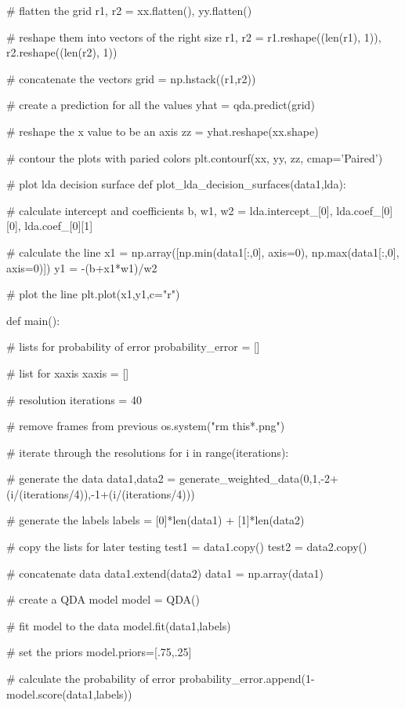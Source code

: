 \documentclass{article}
\begin{document}
{\begin{python}
	# flatten the grid
	r1, r2 = xx.flatten(), yy.flatten()

	# reshape them into vectors of the right size
	r1, r2 = r1.reshape((len(r1), 1)), r2.reshape((len(r2), 1))
	
	# concatenate the vectors
	grid = np.hstack((r1,r2))

	# create a prediction for all the values
	yhat = qda.predict(grid)

	# reshape the x value to be an axis
	zz = yhat.reshape(xx.shape)

	# contour the plots with paried colors
	plt.contourf(xx, yy, zz, cmap='Paired')
		
# plot lda decision surface
def plot_lda_decision_surfaces(data1,lda):

	# calculate intercept and coefficients
	b, w1, w2 = lda.intercept_[0], lda.coef_[0][0], lda.coef_[0][1]    

	# calculate the line
	x1 = np.array([np.min(data1[:,0], axis=0), np.max(data1[:,0], axis=0)])
	y1 = -(b+x1*w1)/w2

	# plot the line
	plt.plot(x1,y1,c="r")
	

def main():
	
		# lists for probability of error
		probability_error = []
	
		# list for xaxis
		xaxis = []
	
		# resolution
		iterations = 40
	
		# remove frames from previous
		os.system("rm this*.png")
	
		# iterate through the resolutions
		for i in range(iterations):
	
			# generate the data
			data1,data2 = generate_weighted_data(0,1,-2+(i/(iterations/4)),-1+(i/(iterations/4)))
	
			# generate the labels
			labels = [0]*len(data1) + [1]*len(data2)
	
			# copy the lists for later testing
			test1 = data1.copy()
			test2 = data2.copy()
	
			# concatenate data
			data1.extend(data2)
			data1 = np.array(data1)
	
			# create a QDA model
			model = QDA()
	
			# fit model to the data
			model.fit(data1,labels)
	
			# set the priors
			model.priors=[.75,.25]
	
			# calculate the probability of error
			probability_error.append(1-model.score(data1,labels))
	

\end{python}}
\end{document}
